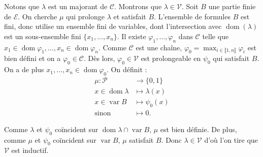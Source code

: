 \documentclass[./main]{subfiles}
\begin{document}
\begin{prv}
    Notons que $\lambda$ est un majorant de $\mathcal{C}$.
    Montrons que $\lambda \in \mathcal{V}$.
    Soit $B$ une partie finie de $\mathcal{E}$. On cherche $\mu$ qui prolonge $\lambda$ et satisfait $B$.
    L'ensemble de formules $B$ est fini, donc utilise un ensemble fini de variables, dont l'intersection avec $\operatorname{dom}(\lambda)$ est un sous-ensemble fini $\{x_1, \ldots, x_n\}$.
    Il existe $\varphi_1, \ldots, \varphi_n$ dans $\mathcal{C}$ telle que $x_1 \in \operatorname{dom} \varphi_1, \ldots, x_n \in \operatorname{dom} \varphi_n$.
    Comme $\mathcal{C}$ est une chaîne, $\varphi_0 = \max_{i \in \llbracket 1,n\rrbracket} \varphi_i$ est bien défini et on a $\varphi_0 \in \mathcal{C}$.
    Dès lors, $\varphi_0 \in \mathcal{V}$ est prolongeable en $\psi_0$ qui satisfait $B$.
    On a de plus $x_1, \ldots, x_n \in \operatorname{dom}\varphi_0$.
    On définit :
    \begin{align*}
      \mu: \mathcal{P} &\longrightarrow \{0,1\}  \\
      x \in \operatorname{dom} \lambda &\longmapsto \lambda(x) \\
      x \in \operatorname{var} B &\longmapsto \psi_0(x) \\
      \text{sinon} &\longmapsto 0
    .\end{align*}

    Comme $\lambda$ et $\psi_0$ coïncident sur $\operatorname{dom} \lambda \cap \operatorname{var} B$, $\mu$ est bien définie.
    De plus, comme $\mu$ et $\psi_0$ coïncident sur $\operatorname{var} B$, $\mu$ satisfait $B$.
    Donc $\lambda \in \mathcal{V}$ d'où l'on tire que $\mathcal{V}$ est inductif.


\end{prv}
\end{document}
